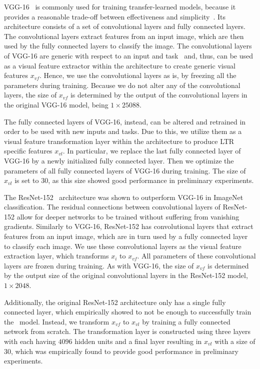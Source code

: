 VGG-16~\cite{simonyan2014very} is commonly used for training transfer-learned models,
because it provides a reasonable trade-off between effectiveness and simplicity~\cite{shan2017two}.
Its architecture consists of a set of convolutional layers and fully connected layers. 
The convolutional layers extract features from an input image, which are then used by the fully connected layers to classify the image. 
The convolutional layers of VGG-16 are generic with respect to an input and task~\citep{donahue2014decaf}
and, thus, can be used as a visual feature extractor within the \modelname{} architecture to create generic visual features $x_{vf}$.
Hence, we use the convolutional layers as is, by freezing all the parameters during training.
Because we do not alter any of the convolutional layers, the size of $x_{vf}$ is determined by the output of the convolutional layers in the original VGG-16 model, being $1\times25088$.

The fully connected layers of VGG-16, instead, can be altered and retrained in order to be used with new inputs and tasks.
Due to this, we utilize them as a visual feature transformation layer within the \modelname{} architecture to produce \ac{LTR} specific features $x_{vl}$.
In particular, we replace the last fully connected layer of VGG-16 by a newly initialized fully connected layer.
Then we optimize the parameters of all fully connected layers of VGG-16 during training.
The size of $x_{vl}$ is set to $30$, as this size showed good performance in preliminary experiments.

The ResNet-152~\cite{he2016deep} architecture was shown to outperform VGG-16 in ImageNet classification.
The residual connections between convolutional layers of ResNet-152 allow for deeper networks to be trained without suffering from vanishing gradients.
Similarly to VGG-16, ResNet-152 has convolutional layers that extract features from an input image, which are in turn used by a fully connected layer to classify each image.
We use these convolutional layers as the visual feature extraction layer, which transforms $x_{i}$ to $x_{vf}$. All parameters of these convolutional layers are frozen during training. As with VGG-16, the size of $x_{vf}$ is determined by the output size of the original convolutional layers in the ResNet-152 model, $1\times2048$.


Additionally, the original ResNet-152 architecture only has a single fully connected layer, which empirically showed to not be enough to successfully train the \modelname~model.
Instead, we transform $x_{vf}$ to $x_{vl}$ by training a fully connected network from scratch.
The transformation layer is constructed using three layers with each having $4096$ hidden units and a final layer resulting in $x_{vl}$ with a size of $30$, which was empirically found to provide good performance in preliminary experiments.


